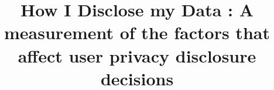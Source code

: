 \documentclass[conference]{IEEEtran}
\begin{document}
%
\title{%
How I Disclose my Data : A measurement of the factors that affect user privacy disclosure decisions }






% 




\end{document}
